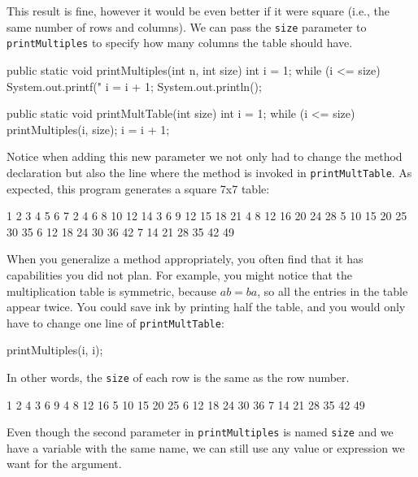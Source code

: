 \documentclass[12pt]{book}
\theoremstyle{exercise}
\begin{document}
This result is fine, however it would be even better if it were square (i.e., the same number of rows and columns).
We can pass the {\tt size} parameter to {\tt printMultiples} to specify how many columns the table should have.

\begin{code}
    public static void printMultiples(int n, int size) {
        int i = 1;
        while (i <= size) {
            System.out.printf("%
            i = i + 1;
        }
        System.out.println();
    }
    
    public static void printMultTable(int size) {
        int i = 1;
        while (i <= size) {
            printMultiples(i, size);
            i = i + 1;
        }
    }
\end{code}

Notice when adding this new parameter we not only had to change the method declaration but also the line where the method is invoked in {\tt printMultTable}.
As expected, this program generates a square 7x7 table:

\begin{stdout}
   1   2   3   4   5   6   7
   2   4   6   8  10  12  14
   3   6   9  12  15  18  21
   4   8  12  16  20  24  28
   5  10  15  20  25  30  35
   6  12  18  24  30  36  42
   7  14  21  28  35  42  49
\end{stdout}

When you generalize a method appropriately, you often find that it has capabilities you did not plan.
For example, you might notice that the multiplication table is symmetric, because $ab = ba$, so all the entries in the table appear twice.
You could save ink by printing half the table, and you would only have to change one line of {\tt printMultTable}:

\begin{code}
      printMultiples(i, i);
\end{code}

In other words, the {\tt size} of each row is the same as the row number.

\begin{stdout}
   1
   2   4
   3   6   9
   4   8  12  16
   5  10  15  20  25
   6  12  18  24  30  36
   7  14  21  28  35  42  49
\end{stdout}

Even though the second parameter in {\tt printMultiples} is named {\tt size} and we have a variable with the same name, we can still use any value or expression we want for the argument.
\end{document}
